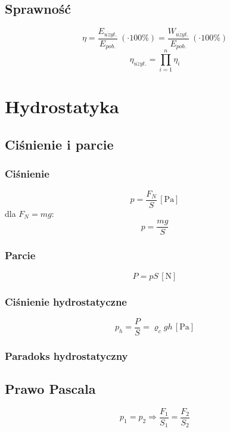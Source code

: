 \documentclass{article}
\numberwithin{equation}{section}
\newcommand{\unit}[1]{\, \left[\mathrm{#1}\right]}
\begin{document}
    \subsection{Sprawność}
      \begin{equation}
        \eta = \frac{E_{u\dot{z}yt.}}{E_{pob.}}\: (\cdot 100\%) = \frac{W_{u\dot{z}yt.}}{E_{pob.}}\: (\cdot 100\%)
      \end{equation}
      \begin{equation}
        \eta_{u\dot{z}yt.} = \prod_{i=1}^n \eta_i
      \end{equation}

  \newpage
  \section{Hydrostatyka}
    \subsection{Ciśnienie i parcie}
      \subsubsection{Ciśnienie}
        \begin{equation}
          p = \frac{F_N}{S} \unit{Pa}
        \end{equation}
        dla $F_N = mg$:
        \begin{equation}
          p = \frac{mg}{S}
        \end{equation}
      \subsubsection{Parcie}
        \begin{equation}
          P = pS \unit{N}
        \end{equation}
      \subsubsection{Ciśnienie hydrostatyczne}
        \begin{equation}
          p_h = \frac{P}{S} = \varrho_cgh \unit{Pa}
        \end{equation}
      \subsubsection{Paradoks hydrostatyczny}
    \subsection{Prawo Pascala}
      \begin{equation}
        p_1 = p_2 \Rightarrow \frac{F_1}{S_1} = \frac{F_2}{S_2}
      \end{equation}
\end{document}
